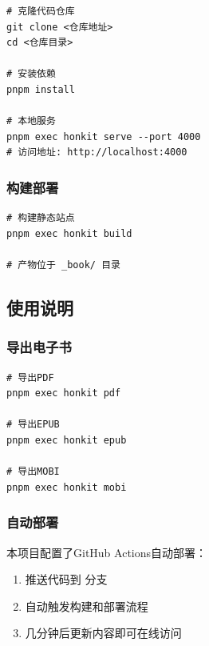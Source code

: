 \begin{lstlisting}[style=terminal]
# 克隆代码仓库
git clone <仓库地址>
cd <仓库目录>

# 安装依赖
pnpm install

# 本地服务
pnpm exec honkit serve --port 4000
# 访问地址: http://localhost:4000
\end{lstlisting}

\hypertarget{ux6784ux5efaux90e8ux7f72}{%
\subsubsection{构建部署}\label{ux6784ux5efaux90e8ux7f72}}

\begin{lstlisting}[style=terminal]
# 构建静态站点
pnpm exec honkit build

# 产物位于 _book/ 目录
\end{lstlisting}

\hypertarget{ux4f7fux7528ux8bf4ux660e}{%
\subsection{使用说明}\label{ux4f7fux7528ux8bf4ux660e}}

\hypertarget{ux5bfcux51faux7535ux5b50ux4e66}{%
\subsubsection{导出电子书}\label{ux5bfcux51faux7535ux5b50ux4e66}}

\begin{lstlisting}[style=terminal]
# 导出PDF
pnpm exec honkit pdf

# 导出EPUB
pnpm exec honkit epub

# 导出MOBI
pnpm exec honkit mobi
\end{lstlisting}

\hypertarget{ux81eaux52a8ux90e8ux7f72}{%
\subsubsection{自动部署}\label{ux81eaux52a8ux90e8ux7f72}}

本项目配置了GitHub Actions自动部署：

\begin{enumerate}
\def\labelenumi{\arabic{enumi}.}
\tightlist
\item
  推送代码到  分支
\item
  自动触发构建和部署流程
\item
  几分钟后更新内容即可在线访问
\end{enumerate}

